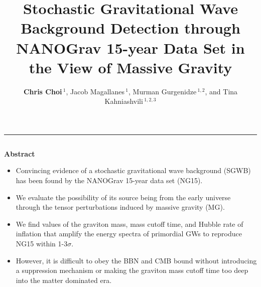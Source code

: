 \documentclass{beamer}                             %
\title[]{\Huge Stochastic Gravitational Wave Background Detection through \\ NANOGrav 15-year Data Set in the View of Massive Gravity}
\author[Choi]{\LARGE \textbf{Chris Choi$\,^1$}, Jacob Magallanes$\,^1$, Murman Gurgenidze$\,^{1,2}$, and Tina Kahniashvili$\,^{1,2,3}$}
\institute[]{\large $\,^1$Carnegie Mellon University, $\,^2$Ilia State University, $\,^3$Abastumani Astrophysical Observatory}
\date[]{}
\newcommand{\blocktitle}[1]{{\Large \textbf{#1}}}
\begin{document}
\begin{frame}[t]
\vspace{-1em}
\titlepage



\vspace{-6cm}

\begin{center}
  \textcolor{darksilver}{\rule{\textwidth}{2mm}}
\end{center}

\begin{columns}[T]


\begin{column}{0.30\textwidth}
  \begin{tcolorbox}
    \blocktitle{Abstract}
    \begin{itemize}
        \item Convincing evidence of a stochastic gravitational wave background (SGWB) has been found by the NANOGrav 15-year data set (NG15). 
        \item We evaluate the possibility of its source being from the early universe through the tensor perturbations induced by massive gravity (MG). 
        \item We find values of the graviton mass, mass cutoff time, and Hubble rate of inflation that amplify the energy spectra of primordial GWs to reproduce NG15 within 1-3$\sigma$. 
        \item However, it is difficult to obey the BBN and CMB bound without introducing a suppression mechanism or making the graviton mass cutoff time too deep into the matter dominated era.
    \end{itemize}
  \end{tcolorbox}


\end{column}
\end{columns}
\end{frame}
\end{document}
